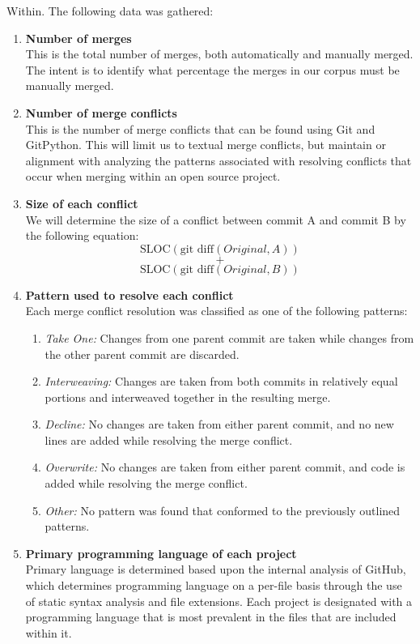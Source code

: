 \documentclass{sig-alternate-05-2015}
\begin{document}
Within. The following data was gathered:
\begin{enumerate}
\item \textbf{Number of merges}\\
	This is the total number of merges, both automatically and manually merged. The intent is to identify what percentage the merges in our corpus must be manually merged.
\item \textbf{Number of merge conflicts}\\
	This is the number of merge conflicts that can be found using Git and GitPython. This will limit us to textual merge conflicts, but maintain or alignment with analyzing the patterns associated with resolving conflicts that occur when merging within an open source project.
\item \textbf{Size of each conflict}\\
	We will determine the size of a conflict between commit A and commit B by the following equation:\\ 
	$$\text{SLOC}(\text{git diff}(Original, A))$$
	$$+$$
	$$\text{SLOC}(\text{git diff}(Original, B))$$
\item \textbf{Pattern used to resolve each conflict}\\
	Each merge conflict resolution was classified as one of the following patterns:
	\begin{enumerate}
	\item\textit{Take One:} Changes from one parent commit are taken while changes from the other parent commit are discarded.
	\item\textit{Interweaving:} Changes are taken from both commits in relatively equal portions and interweaved together in the resulting merge.
	\item\textit{Decline:} No changes are taken from either parent commit, and no new lines are added while resolving the merge conflict.
	\item\textit{Overwrite:} No changes are taken from either parent commit, and code is added while resolving the merge conflict.
	\item\textit{Other:} No pattern was found that conformed to the previously outlined patterns. 
	\end{enumerate}
\item \textbf{Primary programming language of each project}\\
Primary language is determined based upon the internal analysis of GitHub, which determines programming language on a per-file basis through the use of static syntax analysis and file extensions. Each project is designated with a programming language that is most prevalent in the files that are included within it.
\end{enumerate}
\end{document}
